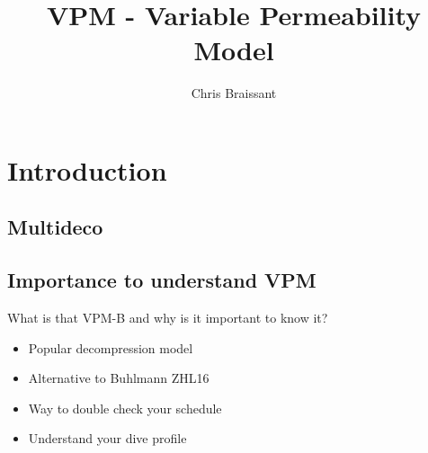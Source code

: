 \documentclass[aspectratio=1610,english,14pt]{beamer}
\author[]{Chris Braissant}
\title[]{VPM - Variable Permeability Model}
\institute{Ban's Diving Resort}
\begin{document}
\begin{frame}[plain]
	\maketitle
\end{frame}

\section{Introduction}
\subsection{Multideco}
\begin{frame}{}
\end{frame}

\begin{frame}
\end{frame}

\begin{frame}
\end{frame}

\subsection{Importance to understand VPM}
\begin{frame}{\insertsubsection}
	What is that VPM-B and why is it important to know it?
	\begin{itemize}
		\item Popular decompression model
		\item Alternative to Buhlmann ZHL16
		\item Way to double check your schedule
		\item Understand your dive profile
	\end{itemize}
\end{frame}
\end{document}
